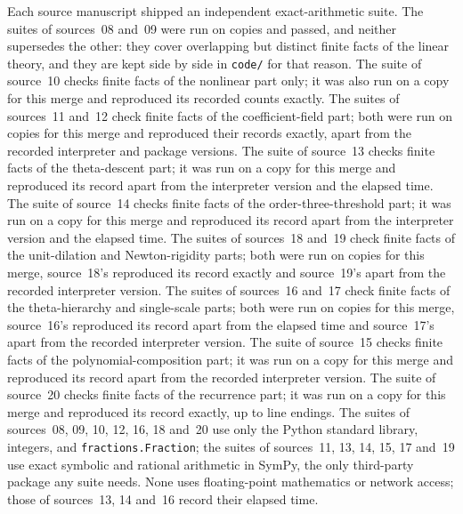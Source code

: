 \documentclass[11pt]{article}
\numberwithin{equation}{section}
\theoremstyle{definition}
\theoremstyle{remark}
\begin{document}
Each source manuscript shipped an independent exact-arithmetic suite. The
suites of sources~08 and~09 were run on copies and passed, and neither
supersedes the other: they cover overlapping but distinct finite facts of the
linear theory, and they are kept side by side in \texttt{code/} for that
reason. The suite of source~10 checks finite facts of the nonlinear part
only; it was also run on a copy for this merge and reproduced its recorded
counts exactly. The suites of sources~11 and~12 check finite facts of the
coefficient-field part; both were run on copies for this merge and reproduced
their records exactly, apart from the recorded interpreter and package
versions. The suite of source~13 checks finite facts of the theta-descent
part; it was run on a copy for this merge and reproduced its record apart from
the interpreter version and the elapsed time. The suite of source~14 checks
finite facts of the order-three-threshold part; it was run on a copy for this
merge and reproduced its record apart from the interpreter version and the
elapsed time. The suites of sources~18 and~19 check finite facts of the
unit-dilation and Newton-rigidity parts; both were run on copies for this
merge, source~18's reproduced its record exactly and source~19's apart from
the recorded interpreter version. The suites of sources~16 and~17 check
finite facts of the theta-hierarchy and single-scale parts; both were run on
copies for this merge, source~16's reproduced its record apart from the
elapsed time and source~17's apart from the recorded interpreter version. The
suite of source~15 checks finite facts of the polynomial-composition part; it
was run on a copy for this merge and reproduced its record apart from the
recorded interpreter version. The suite of source~20 checks finite facts of
the recurrence part; it was run on a copy for this merge and reproduced its
record exactly, up to line endings. The
suites of sources~08, 09, 10, 12, 16, 18 and~20 use only the Python standard
library, integers, and \texttt{fractions.Fraction}; the suites of sources~11,
13, 14, 15, 17 and~19 use exact symbolic and rational arithmetic in SymPy, the
only third-party package any suite needs. None uses floating-point
mathematics or network access; those of sources~13, 14 and~16 record their
elapsed time.
\end{document}
